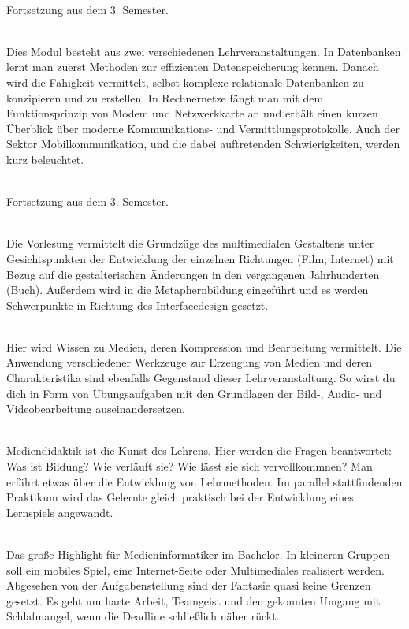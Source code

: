 \textbf{} \\
Fortsetzung aus dem 3. Semester.

\textbf{} \\
Dies Modul besteht aus zwei verschiedenen Lehrveranstaltungen.
In Datenbanken lernt man zuerst Methoden zur effizienten Datenspeicherung kennen.
Danach wird die Fähigkeit vermittelt, selbst komplexe relationale Datenbanken zu konzipieren und zu erstellen.
In Rechnernetze fängt man mit dem Funktionsprinzip von Modem und Netzwerkkarte an und erhält einen kurzen Überblick über moderne Kommunikations- und Vermittlungsprotokolle.
Auch der Sektor Mobilkommunikation, und die dabei auftretenden Schwierigkeiten, werden kurz beleuchtet.

\textbf{} \\
Fortsetzung aus dem 3. Semester.

\textbf{} \\
Die Vorlesung vermittelt die Grundzüge des multimedialen Gestaltens unter Gesichtspunkten der Entwicklung der einzelnen Richtungen (Film, Internet) mit Bezug auf die gestalterischen Änderungen in den vergangenen Jahrhunderten (Buch).
Außerdem wird in die Metaphernbildung eingeführt und es werden Schwerpunkte in Richtung des Interfacedesign gesetzt.

\textbf{} \\
Hier wird Wissen zu Medien, deren Kompression und Bearbeitung vermittelt.
Die Anwendung verschiedener Werkzeuge zur Erzeugung von Medien und deren Charakteristika sind ebenfalls Gegenstand dieser Lehrveranstaltung.
So wirst du dich in Form von Übungsaufgaben mit den Grundlagen der Bild-, Audio- und Videobearbeitung auseinandersetzen.

\textbf{} \\
Mediendidaktik ist die \glqq Kunst des Lehrens\grqq.
Hier werden die Fragen beantwortet:
Was ist Bildung?
Wie verläuft sie?
Wie lässt sie sich vervollkommnen?
Man erfährt etwas über die Entwicklung von Lehrmethoden.
Im parallel stattfindenden Praktikum wird das Gelernte gleich praktisch bei der Entwicklung eines Lernspiels angewandt.

\textbf{} \\
Das große Highlight für Medieninformatiker im Bachelor.
In kleineren Gruppen soll ein mobiles Spiel, eine Internet-Seite oder Multimediales realisiert werden.
Abgesehen von der Aufgabenstellung sind der Fantasie quasi keine Grenzen gesetzt.
Es geht um harte Arbeit, Teamgeist und den gekonnten Umgang mit Schlafmangel, wenn die Deadline schließlich näher rückt.

